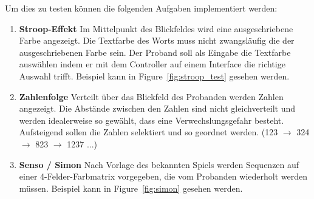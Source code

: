 Um dies zu testen können die folgenden Aufgaben implementiert werden:
\begin{enumerate}
    \item \textbf{Stroop-Effekt} Im Mittelpunkt des Blickfeldes wird eine ausgeschriebene Farbe angezeigt. Die Textfarbe des Worts muss nicht zwangsläufig die der ausgeschriebenen Farbe sein. Der Proband soll als Eingabe die Textfarbe auswählen indem er mit dem Controller auf einem Interface die richtige Auswahl trifft. Beispiel kann in Figure~\ref{fig:stroop_test} gesehen werden.
    \item \textbf{Zahlenfolge} Verteilt über das Blickfeld des Probanden werden Zahlen angezeigt. Die Abstände zwischen den Zahlen sind nicht gleichverteilt und werden idealerweise so gewählt, dass eine Verwechslungsgefahr besteht. Aufsteigend sollen die Zahlen selektiert und so geordnet werden. (123 $\rightarrow$ 324 $\rightarrow$ 823 $\rightarrow$ 1237 ...)
    \item \textbf{Senso / Simon} Nach Vorlage des bekannten Spiels werden Sequenzen auf einer 4-Felder-Farbmatrix vorgegeben, die vom Probanden wiederholt werden müssen. Beispiel kann in Figure~\ref{fig:simon} gesehen werden.
\end{enumerate}


